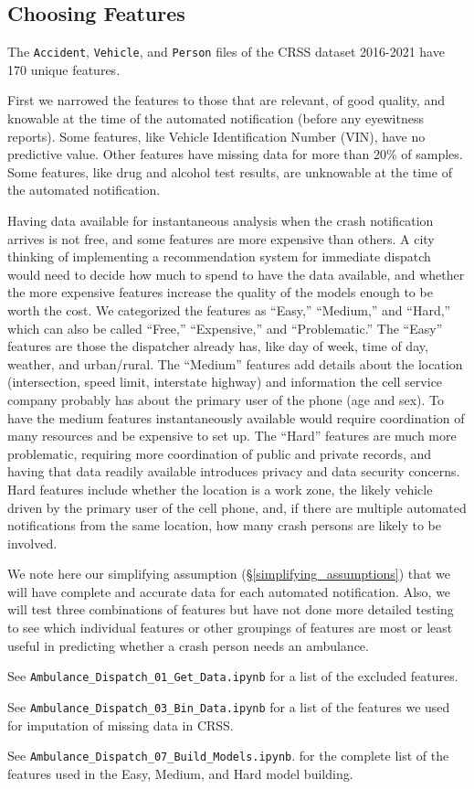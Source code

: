 \subsection{Choosing Features}
\label{features}

The \verb|Accident|, \verb|Vehicle|, and \verb|Person| files of the CRSS dataset 2016-2021 have 170 unique features.  

First we narrowed the features to those that are relevant, of good quality, and knowable at the time of the automated notification (before any eyewitness reports).  Some features, like Vehicle Identification Number (VIN), have no predictive value.  Other features have missing data for more than 20\% of samples.  Some features, like drug and alcohol test results, are unknowable at the time of the automated notification.

Having data available for instantaneous analysis when the crash notification arrives is not free, and some features are more expensive than others.  A city thinking of implementing a recommendation system for immediate dispatch would need to decide how much to spend to have the data available, and whether the more expensive features increase the quality of the models enough to be worth the cost.  We categorized the features as ``Easy,'' ``Medium,'' and ``Hard,'' which can also be called ``Free,'' ``Expensive,'' and ``Problematic.''   The ``Easy'' features are those the dispatcher already has, like day of week, time of day, weather, and urban/rural.  The ``Medium'' features add details about the location (intersection, speed limit, interstate highway) and information the cell service company probably has about the primary user of the phone (age and sex).  To have the medium features instantaneously available would require coordination of many resources and be expensive to set up.  The ``Hard'' features are much more problematic, requiring more coordination of public and private records, and having that data readily available introduces privacy and data security concerns.  Hard features include whether the location is a work zone, the likely vehicle driven by the primary user of the cell phone, and, if there are multiple automated notifications from the same location, how many crash persons are likely to be involved.   

We note here our simplifying assumption (\S \ref{simplifying_assumptions}) that we will have complete and accurate data for each automated notification.  Also, we will test three combinations of features but have not done more detailed testing to see which individual features or other groupings of features are most or least useful in predicting whether a crash person needs an ambulance.  

See 
\verb|Ambulance_Dispatch_01_Get_Data.ipynb|  
for a list of the excluded features.

See \verb|Ambulance_Dispatch_03_Bin_Data.ipynb|
for a list of the features we used for imputation of missing data in CRSS.


See
\verb|Ambulance_Dispatch_07_Build_Models.ipynb|.
for the complete list of the features used in the Easy, Medium, and Hard model building.